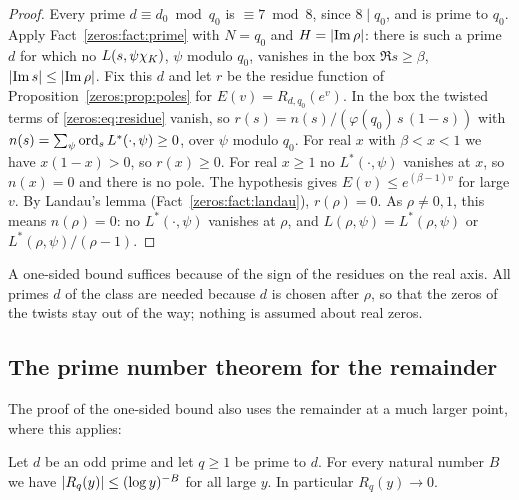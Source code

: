 \begin{proof}
Every prime $d \equiv d_0 \bmod q_0$ is $\equiv 7 \bmod 8$, since $8 \mid q_0$, and is prime to
$q_0$. Apply Fact~\ref{zeros:fact:prime} with $N = q_0$ and $H = \lvert\operatorname{Im} \rho\rvert$: there is such a
prime $d$ for which no $L(s,\psi\chi_K)$, $\psi$ modulo $q_0$, vanishes in the box
$\Re s \ge \beta$, $\lvert\operatorname{Im} s\rvert \le \lvert\operatorname{Im}\rho\rvert$. Fix this $d$ and let $r$ be the residue
function of Proposition~\ref{zeros:prop:poles} for $E(v) = R_{d,q_0}(e^v)$. In the box the twisted
terms of \eqref{zeros:eq:residue} vanish, so $r(s) = n(s)/(\varphi(q_0)\,s\,(1-s))$ with
$n(s) = \sum_\psi \operatorname{ord}_s L^*(\cdot,\psi) \ge 0$, over $\psi$ modulo $q_0$. For real $x$ with $\beta < x < 1$ we have $x(1-x) > 0$, so $r(x) \ge 0$. For real $x \ge 1$ no
$L^*(\cdot,\psi)$ vanishes at $x$, so $n(x) = 0$ and there is no pole. The hypothesis gives
$E(v) \le e^{(\beta-1)v}$ for large $v$. By Landau's lemma (Fact~\ref{zeros:fact:landau}),
$r(\rho) = 0$. As $\rho \ne 0, 1$, this means $n(\rho) = 0$: no $L^*(\cdot,\psi)$ vanishes at
$\rho$, and $L(\rho,\psi) = L^*(\rho,\psi)$ or $L^*(\rho,\psi)/(\rho - 1)$.
\end{proof}

\begin{remark}
A one-sided bound suffices because of the sign of the residues on the real axis. All primes $d$
of the class are needed because $d$ is chosen after $\rho$, so that the zeros of the twists stay
out of the way; nothing is assumed about real zeros.
\end{remark}

\subsection{The prime number theorem for the remainder}

The proof of the one-sided bound also uses the remainder at a much larger point, where this applies:

\begin{theorem}
\label{zeros:thm:pnt}
Let $d$ be an odd prime and let $q \ge 1$ be prime to $d$. For every natural number $B$ we have
$\lvert R_q(y)\rvert \le (\log y)^{-B}$ for all large $y$. In particular $R_q(y) \to 0$.
\end{theorem}

